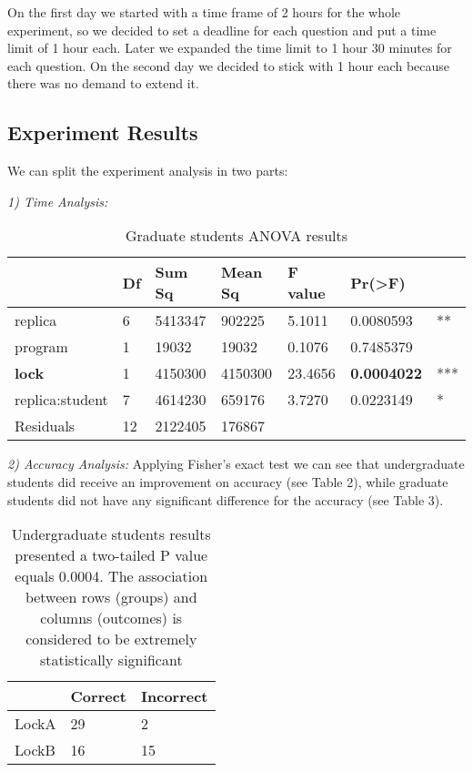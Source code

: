 On the first day we started with a time frame of 2 hours for the whole experiment, so we decided to set a deadline for each question and put a time limit of 1 hour each. Later we expanded the time limit to 1 hour 30 minutes for each question. On the second day we decided to stick with 1 hour each because there was no demand to extend it.

\subsection{Experiment Results}

We can split the experiment analysis in two parts:

\emph{1) Time Analysis:} %

\begin{table}
\begin{center}
\caption{Graduate students ANOVA results}
\begin{tabular}{|l|l|l|l|l|ll|}
\hline
                & Df & Sum Sq  & Mean Sq & F value &   Pr(>F)  &     \\
\hline  
replica         &  6 & 5413347 &  902225 &  5.1011 & 0.0080593 & **  \\
program         &  1 &   19032 &   19032 &  0.1076 & 0.7485379 &     \\   
{\bf lock}            &  1 & 4150300 & 4150300 & 23.4656 & {\bf 0.0004022} & *** \\
replica:student &  7 & 4614230 &  659176 &  3.7270 & 0.0223149 & *   \\
Residuals       & 12 & 2122405 &  176867 &         &           &     \\
\hline
\end{tabular}
\end{center}
\end{table}

\emph{2) Accuracy Analysis:} Applying Fisher's exact test we can see that undergraduate students did receive an improvement on accuracy (see Table 2), while graduate students did not have any significant difference for the accuracy (see Table 3).

\begin{table}
\begin{center}
\caption{Undergraduate students results presented a two-tailed P value equals 0.0004. The association between rows (groups) and columns (outcomes) is considered to be extremely statistically significant}
\begin{tabular}{|l|l|l|}
\hline
 & Correct & Incorrect\\
\hline
LockA & 29 & 2\\
LockB & 16 & 15\\
\hline
\end{tabular}
\end{center}
\end{table}

